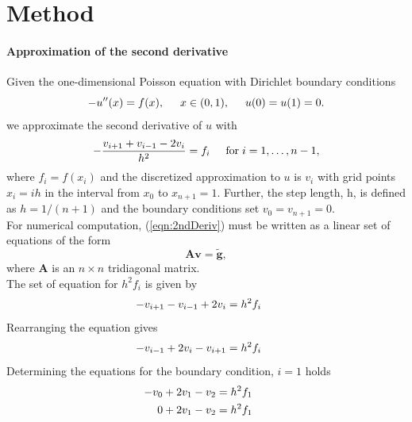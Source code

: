\documentclass[%
oneside,                 %
final,                   %
10pt]{article}
\begin{document}
\section*{Method}
\paragraph{Approximation of the second derivative}
Given the one-dimensional Poisson equation with Dirichlet boundary conditions
\begin{equation*}
-u''(x) = f(x), \hspace{0.5cm} x\in(0,1), \hspace{0.5cm} u(0) = u(1) = 0.
\end{equation*}
we approximate the second derivative of $u$ with
\begin{equation}\label{eqn:2ndDeriv}
   -\frac{v_{i+1}+v_{i-1}-2v_i}{h^2} = f_i  \hspace{0.5cm} \mathrm{for} \hspace{0.1cm} i=1,\dots, n-1,
\end{equation}
where $f_i=f(x_i)$ and the discretized approximation to $u$ is $v_i$ with grid points $x_i = ih$ in the interval from $x_0$ to $x_{n+1}=1$.
Further, the step length, h,  is defined as $h=1/(n+1)$ and the boundary conditions set $v_0 = v_{n+1}=0$. \\
For numerical computation, (\ref{eqn:2ndDeriv}) must be written as a linear set of equations of the form
\begin{equation*}
   \mathbf{A}\mathbf{v} = \tilde{\mathbf{g}},
\end{equation*}
where $\mathbf{A}$ is an $n\times n$  tridiagonal matrix.\\
The set of equation for $h^2f_i$ is given by
\begin{equation*}
   -v_{i+1}-v_{i-1}+2v_i = h^2f_i  \hspace{0.5cm} 
\end{equation*}
Rearranging the equation gives
\begin{equation}
  -v_{i-1}+2v_i - v_{i+1}= h^2f_i  \hspace{0.5cm} 
\end{equation}
Determining the equations for the boundary condition, $i=1$ holds 
\begin{equation}
\begin{aligned}
  -v_{0}+2v_1 - v_{2}&= h^2f_1  \hspace{0.5cm} \\
  0 + 2v_1 - v_{2}&= h^2f_1  \hspace{0.5cm} 
\end{aligned}
\end{equation}
\end{document}
